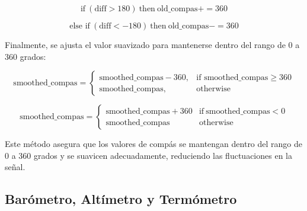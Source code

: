             \begin{equation}
                \text{if} \ (\text{diff} > 180) \ \text{then} \ \text{old\_compas} += 360
            \end{equation}
                
            \begin{equation}
                \text{else if} \ (\text{diff} < -180) \ \text{then} \ \text{old\_compas} -= 360
            \end{equation}
                
            \vspace{5px}

            Finalmente, se ajusta el valor suavizado para mantenerse dentro del rango de 0 a 360 grados:\vspace{5px}
           
            \begin{equation}
                \text{smoothed\_compas} =
                \begin{cases} 
                \text{smoothed\_compas} - 360, & \text{if } \text{smoothed\_compas} \geq 360 \\
                \text{smoothed\_compas}, & \text{otherwise}
                \end{cases}
            \end{equation}
                


            \begin{equation}
            \text{smoothed\_compas} =
            \begin{cases} 
            \text{smoothed\_compas} + 360 & \text{if} \ \text{smoothed\_compas} < 0 \\
            \text{smoothed\_compas} & \text{otherwise}
            \end{cases}
            \end{equation}
            
            Este método asegura que los valores de compás se mantengan dentro del rango de 0 a 360 grados y se suavicen adecuadamente, reduciendo las fluctuaciones en la señal.\vspace{5px}



            \subsection{Barómetro, Altímetro y Termómetro}\vspace{5px}

